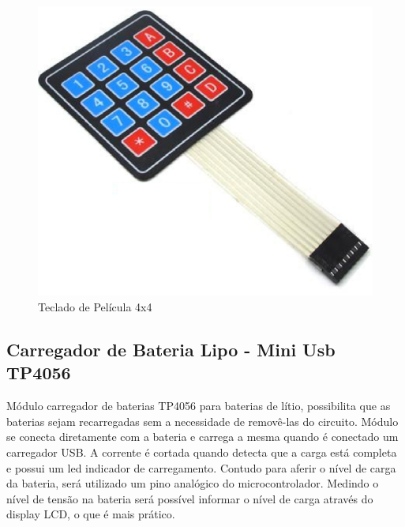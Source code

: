 \begin{figure}[!ht]
  \centering
  \includegraphics[keepaspectratio=true,scale=0.45]{figuras/teclado.eps}
  \caption{Teclado de Película 4x4}
\end{figure}

\subsection{Carregador de Bateria Lipo - Mini Usb TP4056}
Módulo carregador de baterias TP4056 para baterias de lítio, possibilita que as baterias sejam recarregadas sem a necessidade de removê-las do circuito. Módulo se conecta diretamente com a bateria e carrega a mesma quando é conectado um carregador USB. A corrente é cortada quando detecta que a carga está completa e possui um led indicador de carregamento. Contudo para aferir o nível de carga da bateria, será utilizado um pino analógico do microcontrolador. Medindo o nível de tensão na bateria será possível  informar o  nível de  carga através do display LCD, o que é mais prático.


